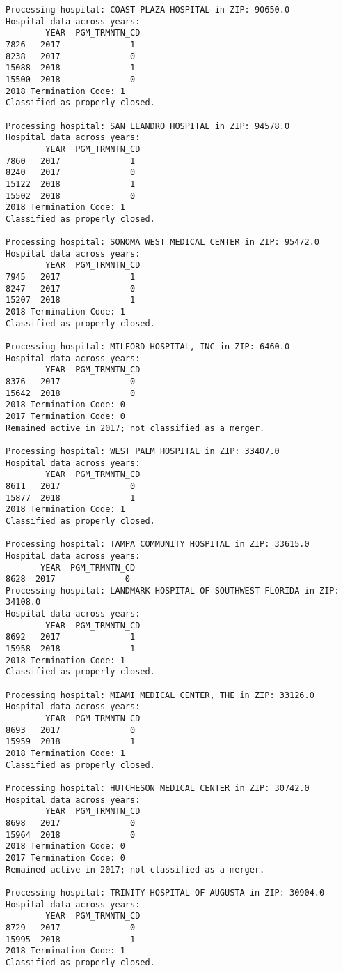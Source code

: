 \documentclass[
  letterpaper,
  DIV=11,
  numbers=noendperiod]{scrartcl}
\begin{document}
\begin{verbatim}
Processing hospital: COAST PLAZA HOSPITAL in ZIP: 90650.0
Hospital data across years:
        YEAR  PGM_TRMNTN_CD
7826   2017              1
8238   2017              0
15088  2018              1
15500  2018              0
2018 Termination Code: 1
Classified as properly closed.

Processing hospital: SAN LEANDRO HOSPITAL in ZIP: 94578.0
Hospital data across years:
        YEAR  PGM_TRMNTN_CD
7860   2017              1
8240   2017              0
15122  2018              1
15502  2018              0
2018 Termination Code: 1
Classified as properly closed.

Processing hospital: SONOMA WEST MEDICAL CENTER in ZIP: 95472.0
Hospital data across years:
        YEAR  PGM_TRMNTN_CD
7945   2017              1
8247   2017              0
15207  2018              1
2018 Termination Code: 1
Classified as properly closed.

Processing hospital: MILFORD HOSPITAL, INC in ZIP: 6460.0
Hospital data across years:
        YEAR  PGM_TRMNTN_CD
8376   2017              0
15642  2018              0
2018 Termination Code: 0
2017 Termination Code: 0
Remained active in 2017; not classified as a merger.

Processing hospital: WEST PALM HOSPITAL in ZIP: 33407.0
Hospital data across years:
        YEAR  PGM_TRMNTN_CD
8611   2017              0
15877  2018              1
2018 Termination Code: 1
Classified as properly closed.

Processing hospital: TAMPA COMMUNITY HOSPITAL in ZIP: 33615.0
Hospital data across years:
       YEAR  PGM_TRMNTN_CD
8628  2017              0
Processing hospital: LANDMARK HOSPITAL OF SOUTHWEST FLORIDA in ZIP: 34108.0
Hospital data across years:
        YEAR  PGM_TRMNTN_CD
8692   2017              1
15958  2018              1
2018 Termination Code: 1
Classified as properly closed.

Processing hospital: MIAMI MEDICAL CENTER, THE in ZIP: 33126.0
Hospital data across years:
        YEAR  PGM_TRMNTN_CD
8693   2017              0
15959  2018              1
2018 Termination Code: 1
Classified as properly closed.

Processing hospital: HUTCHESON MEDICAL CENTER in ZIP: 30742.0
Hospital data across years:
        YEAR  PGM_TRMNTN_CD
8698   2017              0
15964  2018              0
2018 Termination Code: 0
2017 Termination Code: 0
Remained active in 2017; not classified as a merger.

Processing hospital: TRINITY HOSPITAL OF AUGUSTA in ZIP: 30904.0
Hospital data across years:
        YEAR  PGM_TRMNTN_CD
8729   2017              0
15995  2018              1
2018 Termination Code: 1
Classified as properly closed.


\end{verbatim}
\end{document}
